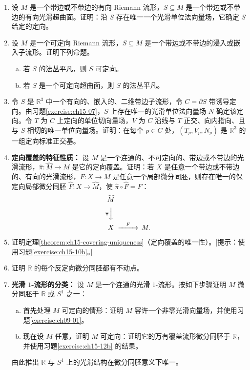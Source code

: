 \documentclass[../../main.tex]{subfiles}
\begin{document}
\begin{enumerate}
\item\label{exercise:ch15-07} 设 $M$ 是一个带边或不带边的有向 Riemann 流形，$S\subseteq M$ 是一个带边或不带边的有向光滑超曲面。证明：沿 $S$ 存在唯一一个光滑单位法向量场，它确定 $S$ 给定的定向。

\item\label{exercise:ch15-08b} 设 $M$ 是一个可定向 Riemann 流形，$S\subseteq M$ 是一个带边或不带边的浸入或嵌入子流形。证明下列命题。
\begin{enumerate}[(a)]
\item 若 $S$ 的法丛平凡，则 $S$ 可定向。
\item 若 $S$ 是一个可定向超曲面，则 $S$ 的法丛平凡。
\end{enumerate}

\item\label{exercise:ch15-09} 令 $S$ 是 $\mathbb{R}^3$ 中一个有向的、嵌入的、二维带边子流形，令 $C=\partial S$ 带诱导定向。由习题\ref{exercise:ch15-07}，$S$ 上存在唯一的光滑单位法向量场 $N$ 确定该定向。令 $T$ 为 $C$ 上定向的单位切向量场，$V$ 为 $C$ 沿线与 $T$ 正交、向内指向、且与 $S$ 相切的唯一单位向量场。证明：在每个 $p\in C$ 处，$(T_p,V_p,N_p)$ 是 $\mathbb{R}^3$ 的一组定向标准正交基。

\item\label{exercise:ch15-10b} \textbf{定向覆盖的特征性质：} 设 $M$ 是一个连通的、不可定向的、带边或不带边的光滑流形，$\widehat\pi:\widehat M\to M$ 是它的定向覆盖。证明：若 $X$ 是任意一个带边或不带边的、有向的光滑流形，$F:X\to M$ 是任意一个局部微分同胚，则存在唯一的保定向局部微分同胚 $\widehat F:X\to\widehat M$，使 $\widehat\pi\circ\widehat F=F$：
\begin{align*}
\begin{CD}
\widehat M\\
@V\widehat\pi VV\\
X @>F>> M.
\end{CD}
\end{align*}

\item\label{exercise:ch15-11} 证明定理\ref{theorem:ch15-covering-uniqueness}（定向覆盖的唯一性）。[提示：使用习题\ref{exercise:ch15-10b}。]

\item\label{exercise:ch15-12b} 证明 $\mathbb{R}$ 的每个反定向微分同胚都有不动点。

\item\label{exercise:ch15-13b} \textbf{光滑 $1$-流形的分类：} 设 $M$ 是一个连通的光滑 $1$-流形。按如下步骤证明 $M$ 微分同胚于 $\mathbb{R}$ 或 $S^1$ 之一：
\begin{enumerate}[(a)]
\item 首先处理 $M$ 可定向的情形：证明 $M$ 容许一个非零光滑向量场，并使用习题\ref{exercise:ch09-01}。
\item 现在设 $M$ 任意，证明 $M$ 可定向：证明它的万有覆盖流形微分同胚于 $\mathbb{R}$，并使用习题\ref{exercise:ch15-12b} 的结果。
\end{enumerate}
由此推出 $\mathbb{R}$ 与 $S^1$ 上的光滑结构在微分同胚意义下唯一。


\end{enumerate}
\end{document}
